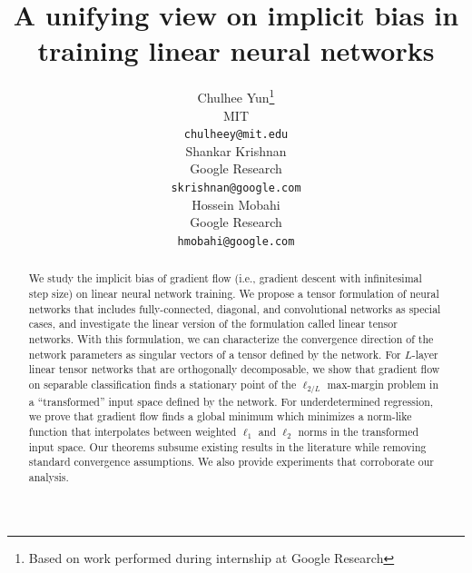 \documentclass{article} %
\title{A unifying view on implicit bias in training linear neural networks}
\author{Chulhee Yun\thanks{Based on work performed during internship at Google Research} \\
MIT\\
\texttt{chulheey@mit.edu} \\
\And
Shankar Krishnan\\
Google Research \\
\texttt{skrishnan@google.com} \\
\And
Hossein Mobahi \\
Google Research \\
\texttt{hmobahi@google.com}
}
\begin{document}
\maketitle

\begin{abstract}


We study the implicit bias of gradient flow (i.e., gradient descent with infinitesimal step size) on linear neural network training. We propose a tensor formulation of neural networks that includes fully-connected, diagonal, and convolutional networks as special cases, and investigate the linear version of the formulation called linear tensor networks. With this formulation, we can characterize the convergence direction of the network parameters as singular vectors of a tensor defined by the network. For $L$-layer linear tensor networks that are orthogonally decomposable, we show that gradient flow on separable classification finds a stationary point of the $\ell_{2/L}$ max-margin problem in a ``transformed'' input space defined by the network. For underdetermined regression, we prove that gradient flow finds a global minimum which minimizes a norm-like function that interpolates between weighted $\ell_1$ and $\ell_2$ norms in the transformed input space. Our theorems subsume existing results in the literature while removing standard convergence assumptions. We also provide experiments that corroborate our analysis.


\end{abstract}
\end{document}
